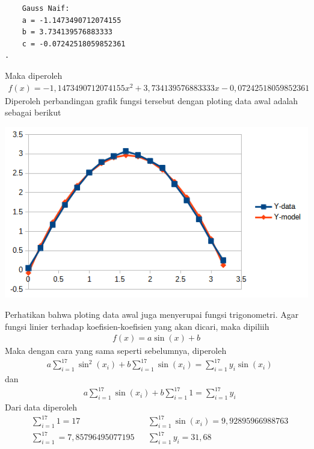 \documentclass[12pt]{article}
\begin{document}
\begin{enumerate}
{\begin{lstlisting}
    Gauss Naif:
    a = -1.1473490712074155
    b = 3.734139576883333
    c = -0.07242518059852361
.
        \end{lstlisting}
        Maka diperoleh
        \begin{align*}
            f(x) = -1,1473490712074155x^2 + 3,734139576883333x -0,07242518059852361
        \end{align*}
        Diperoleh perbandingan grafik fungsi tersebut dengan ploting data awal adalah sebagai berikut
        \begin{center}
            \includegraphics[scale=0.6]{hasil_5.png}
        \end{center}
        Perhatikan bahwa ploting data awal juga menyerupai fungsi trigonometri. Agar fungsi linier terhadap koefisien-koefisien yang akan dicari, maka dipiliih
        \begin{align*}
            f(x) = a\sin(x) + b 
        \end{align*}
        Maka dengan cara yang sama seperti sebelumnya, diperoleh
        \begin{align*}
            & a\sum_{i = 1}^{17}\sin^2(x_i) + b\sum_{i = 1}^{17}\sin(x_i) = \sum_{i = 1}^{17}y_i\sin(x_i)
        \end{align*}
        dan 
        \begin{align*}
            & a\sum_{i = 1}^{17}\sin(x_i) + b\sum_{i = 1}^{17}1 = \sum_{i = 1}^{17}y_i
        \end{align*}
        Dari data diperoleh
        \begin{align*}
            & \sum_{i = 1}^{17}1 = 17 & 
            & \sum_{i = 1}^{17}\sin(x_i) = 9,92895966988763 \\
            & \sum_{i = 1}^{17} = 7,85796495077195 &
            & \sum_{i = 1}^{17}y_i = 31,68 \\

\end{align*}}
\end{enumerate}
\end{document}
